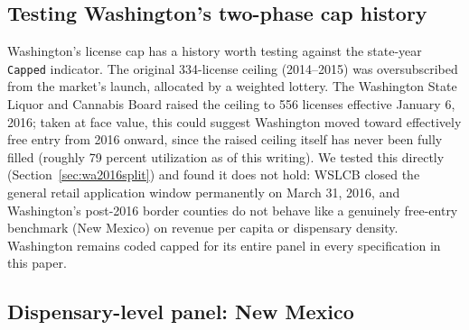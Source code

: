 \documentclass[12pt]{article}
\begin{document}
\subsection{Testing Washington's two-phase cap history}
\label{sec:localbarrier}

Washington's license cap has a history worth testing against the state-year \texttt{Capped} indicator. The
original 334-license ceiling (2014--2015) was oversubscribed from the market's launch, allocated by a
weighted lottery. The Washington State Liquor and Cannabis Board raised the ceiling to 556 licenses effective
January 6, 2016; taken at face value, this could suggest Washington moved toward effectively free entry from
2016 onward, since the raised ceiling itself has never been fully filled (roughly 79 percent utilization as of
this writing). We tested this directly (Section~\ref{sec:wa2016split}) and found it does not hold: WSLCB
closed the general retail application window permanently on March 31, 2016, and Washington's post-2016 border
counties do not behave like a genuinely free-entry benchmark (New Mexico) on revenue per capita or dispensary
density. Washington remains coded capped for its entire panel in every specification in this paper.

\subsection{Dispensary-level panel: New Mexico}
\label{sec:nmdispensary}
\end{document}
